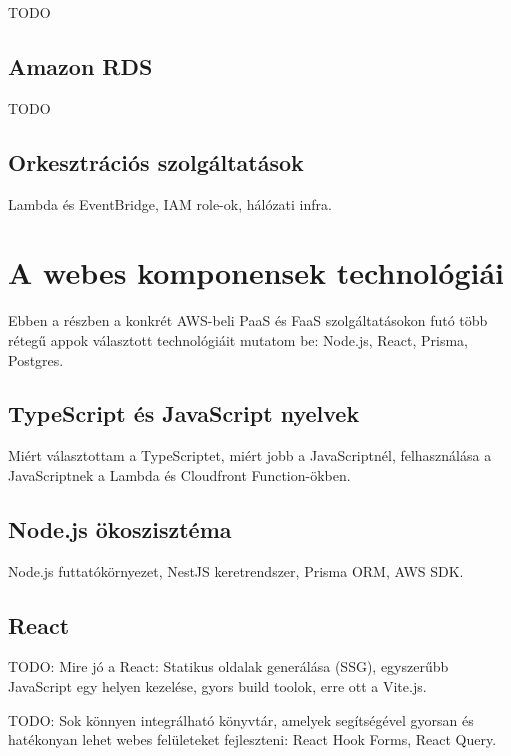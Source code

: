 TODO

\subsection{Amazon RDS}

TODO

\subsection{Orkesztrációs szolgáltatások}

Lambda és EventBridge, IAM role-ok, hálózati infra.

\section{A webes komponensek technológiái}

Ebben a részben a konkrét AWS-beli PaaS és FaaS szolgáltatásokon futó több rétegű appok választott technológiáit mutatom be: Node.js, React, Prisma, Postgres.

\subsection{TypeScript és JavaScript nyelvek}

Miért választottam a TypeScriptet, miért jobb a JavaScriptnél, felhasználása a JavaScriptnek a Lambda és Cloudfront Function-ökben.

\subsection{Node.js ökoszisztéma}

Node.js futtatókörnyezet, NestJS keretrendszer, Prisma ORM, AWS SDK.

\subsection{React}

TODO: Mire jó a React: Statikus oldalak generálása (SSG), egyszerűbb JavaScript egy helyen kezelése, gyors build toolok, erre ott a Vite.js.

TODO: Sok könnyen integrálható könyvtár, amelyek segítségével gyorsan és hatékonyan lehet webes felületeket fejleszteni: React Hook Forms, React Query.
